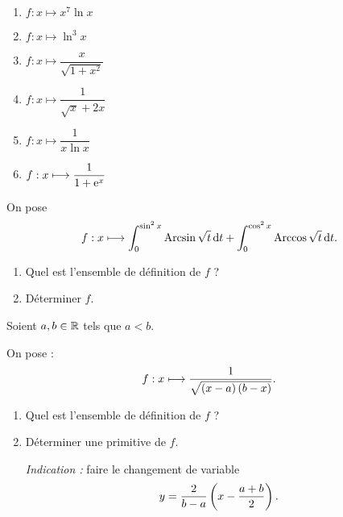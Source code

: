 \begin{exo}[Exercice 2]
\begin{enumerate}
\item \(f:x\mapsto x^7\ln x\) \\

\item \(f:x\mapsto\ln^3x\) \\

\item \(f:x\mapsto\dfrac{x}{\sqrt{1+x^2}}\) \\

\item \(f:x\mapsto\dfrac{1}{\sqrt{x}+2x}\) \\

\item \(f:x\mapsto\dfrac{1}{x\ln x}\) \\

\item \(f:x\longmapsto\dfrac{1}{1+\mathrm{e}^{x}}\)
\end{enumerate}
\end{exo}

\begin{corr}
\end{corr}

\begin{exo}[Exercice 3]
On pose \[f:x\mapsto\int_0^{\sin^2x}\Arcsin\sqrt{t}\odif{t}+\int_0^{\cos^2x}\Arccos\sqrt{t}\odif{t}.\]

\begin{enumerate}
\item Quel est l'ensemble de définition de \(f\) ? \\

\item Déterminer \(f\).
\end{enumerate}
\end{exo}

\begin{corr}
\end{corr}

\begin{exo}[Exercice 4]
Soient \(a,b\in\mathbb{R}\) tels que \(a<b\).

On pose : \[f:x\longmapsto\dfrac{1}{\sqrt{\left(x-a\right)\left(b-x\right)}}.\]

\begin{enumerate}
\item Quel est l'ensemble de définition de \(f\) ? \\

\item Déterminer une primitive de \(f\).

\textit{Indication :} faire le changement de variable \[y=\dfrac{2}{b-a}\left(x-\dfrac{a+b}{2}\right).\]
\end{enumerate}
\end{exo}

